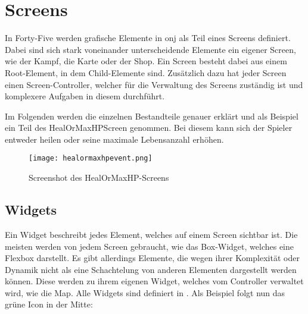 \renewcommand{\kapitelautor}{Autor: Felix Zwickelstorfer}
\section{Screens}\label{sec:screens}

\renewcommand{\kapitelautor}{Autor: Felix Zwickelstorfer}

In Forty-Five werden grafische Elemente in onj als Teil eines Screens definiert.
Dabei sind sich stark voneinander unterscheidende Elemente ein eigener Screen, wie \zB der Kampf, die Karte oder der Shop.
Ein Screen besteht dabei aus einem Root-Element, in dem Child-Elemente sind.
Zusätzlich dazu hat jeder Screen einen Screen-Controller, welcher für die Verwaltung des Screens zuständig ist und komplexere Aufgaben in diesem durchführt.

Im Folgenden werden die einzelnen Bestandteile genauer erklärt und als Beispiel ein Teil des HealOrMaxHPScreen genommen.
Bei diesem kann sich der Spieler entweder heilen oder seine maximale Lebensanzahl erhöhen.
\begin{figure}[H]
    \centering
    \texttt{[image: healormaxhpevent.png]}
    \caption{Screenshot des HealOrMaxHP-Screens}
\end{figure}

\renewcommand{\kapitelautor}{Autor: Felix Zwickelstorfer}
\subsection{Widgets}\label{sec:widgets}
\renewcommand{\kapitelautor}{Autor: Felix Zwickelstorfer}

Ein Widget beschreibt jedes Element, welches auf einem Screen sichtbar ist.
Die meisten werden von jedem Screen gebraucht, wie \zB das Box-Widget, welches eine Flexbox darstellt.
Es gibt allerdings Elemente, die wegen ihrer Komplexität oder Dynamik nicht als eine Schachtelung von anderen Elementen dargestellt werden können.
Diese werden zu ihrem eigenen Widget, welches vom Controller verwaltet wird, wie \zB die Map.
Alle Widgets sind definiert in .
Als Beispiel folgt nun das grüne Icon in der Mitte:







